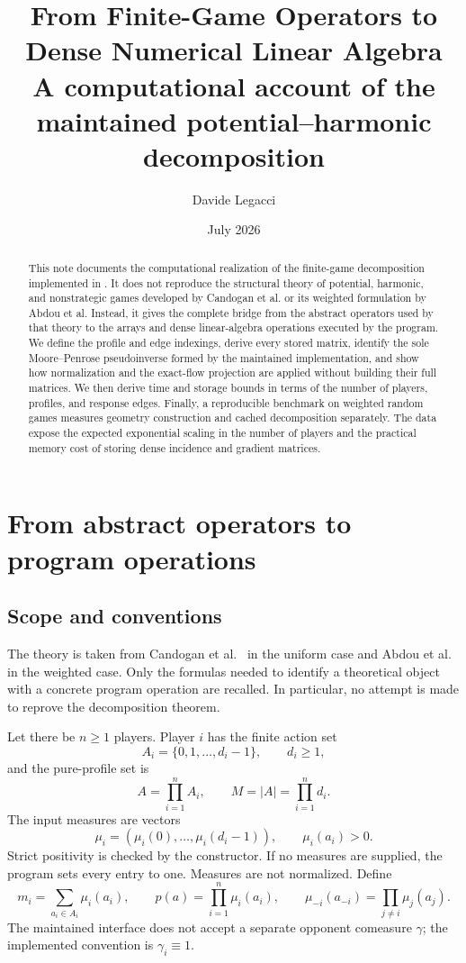 \documentclass[11pt]{article}
\title{From Finite-Game Operators to Dense Numerical Linear Algebra\\
\large A computational account of the maintained potential--harmonic decomposition}
\author{Davide Legacci}
\date{July 2026}
\begin{document}
\maketitle

\begin{abstract}
This note documents the computational realization of the finite-game
decomposition implemented in
.  It does not reproduce the
structural theory of potential, harmonic, and nonstrategic games developed by
Candogan et al. or its weighted formulation by Abdou et al.  Instead, it gives
the complete bridge from the abstract operators used by that theory to the
arrays and dense linear-algebra operations executed by the program.  We define
the profile and edge indexings, derive every stored matrix, identify the sole
Moore--Penrose pseudoinverse formed by the maintained implementation, and show
how normalization and the exact-flow projection are applied without building
their full matrices.  We then derive time and storage bounds in terms of the
number of players, profiles, and response edges.  Finally, a reproducible
benchmark on weighted random games measures geometry construction and cached
decomposition separately.  The data expose the expected exponential scaling
in the number of players and the practical memory cost of storing dense
incidence and gradient matrices.
\end{abstract}

\tableofcontents

\section{From abstract operators to program operations}
\label{sec:implementation}

\subsection{Scope and conventions}

The theory is taken from Candogan et al.~\cite{candogan2011} in the uniform
case and Abdou et al.~\cite{abdou2022} in the weighted case.  Only the formulas
needed to identify a theoretical object with a concrete program operation are
recalled.  In particular, no attempt is made to reprove the decomposition
theorem.

Let there be $n\geq 1$ players.  Player $i$ has the finite action set
\[
 A_i=\{0,1,\ldots,d_i-1\},\qquad d_i\geq 1,
\]
and the pure-profile set is
\[
 A=\prod_{i=1}^n A_i,\qquad M=|A|=\prod_{i=1}^n d_i.
\]
The input measures are vectors
\[
 \mu_i=(\mu_i(0),\ldots,\mu_i(d_i-1)),\qquad \mu_i(a_i)>0.
\]
Strict positivity is checked by the constructor.  If no measures are supplied,
the program sets every entry to one.  Measures are not normalized.  Define
\[
 m_i=\sum_{a_i\in A_i}\mu_i(a_i),\qquad
 p(a)=\prod_{i=1}^n\mu_i(a_i),\qquad
 \mu_{-i}(a_{-i})=\prod_{j\neq i}\mu_j(a_j).
\]
The maintained interface does not accept a separate opponent comeasure
$\gamma$; the implemented convention is $\gamma_i\equiv 1$.
\end{document}
